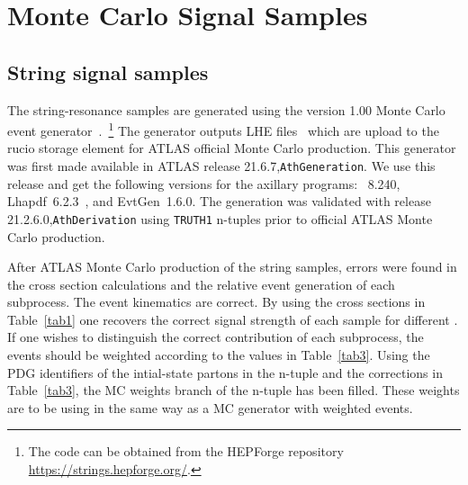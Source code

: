 \section{Monte Carlo Signal Samples}

\subsection{String signal samples}

The string-resonance samples are generated using the \str version 1.00
Monte Carlo event
generator~\cite{Vakilipourtakalou:2018pfo}.~\footnote{The code can be
obtained from the HEPForge
repository \url{https://strings.hepforge.org/}.} 
The generator outputs LHE files~\cite{Alwall:2006yp} which are upload
to the rucio storage element for ATLAS official Monte Carlo production.
This generator was first made available in ATLAS
release 21.6.7,\texttt{AthGeneration}.   
We use this release and get the following versions for the axillary
programs: \pythia~8.240, Lhapdf~6.2.3~\cite{Buckley:2014ana}, and
EvtGen~1.6.0. 
The generation was validated with
release 21.2.6.0,\texttt{AthDerivation} using \texttt{TRUTH1} n-tuples
prior to official ATLAS Monte Carlo production.

After ATLAS Monte Carlo production of the string samples, errors were
found in the cross section calculations and the relative event
generation of each subprocess.
The event kinematics are correct.
By using the cross sections in Table~\ref{tab1} one recovers the
correct signal strength of each sample for different \Ms.
If one wishes to distinguish the correct contribution of each
subprocess, the events should be weighted according to the values in
Table~\ref{tab3}. 
Using the PDG identifiers of the intial-state partons in the n-tuple
and the corrections in Table~\ref{tab3}, the MC weights branch of the
n-tuple has been filled. 
These weights are to be using in the same way as a MC generator with
weighted events.  

